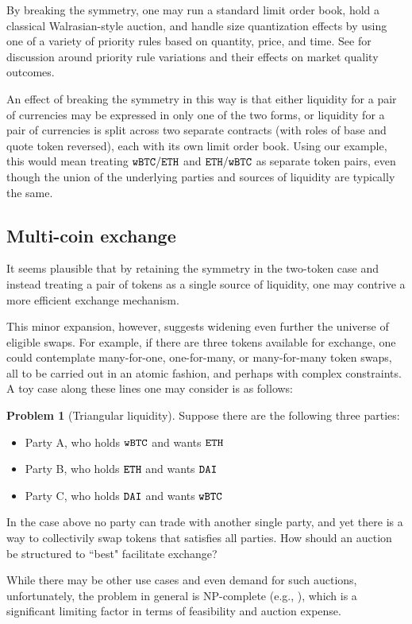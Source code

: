 \documentclass[11pt, reqno]{amsart}
\theoremstyle{definition}
\newtheorem{problem}{Problem}[subsection]
\theoremstyle{remark}
\newcommand{\BTC}{\textnormal{\texttt{wBTC}}}
\newcommand{\ETH}{\textnormal{\texttt{ETH}}}
\newcommand{\DAI}{\textnormal{\texttt{DAI}}}
\begin{document}
By breaking the symmetry, one may run a standard limit order book, hold a
classical Walrasian-style auction, and handle size quantization effects by
using one of a variety of priority rules based on quantity, price, and time.
See \cite{BeLaLiVa22} for discussion around priority rule variations and their
effects on market quality outcomes.

An effect of breaking the symmetry in this way is that either liquidity for a
pair of currencies may be expressed in only one of the two forms, or liquidity
for a pair of currencies is split across two separate contracts (with roles of
base and quote token reversed), each with its own limit order book.
Using our example, this would mean treating $\BTC/\ETH$ and $\ETH/\BTC$ as
separate token pairs, even though the union of the underlying parties and
sources of liquidity are typically the same.

\subsection{Multi-coin exchange}
It seems plausible that by retaining the symmetry in the two-token case and
instead treating a pair of tokens as a single source of liquidity, one may
contrive a more efficient exchange mechanism.

This minor expansion, however, suggests widening even further the universe of
eligible swaps. For example, if there are three tokens available for exchange,
one could contemplate many-for-one, one-for-many, or many-for-many token swaps,
all to be carried out in an atomic fashion, and perhaps with complex
constraints. A toy case along these lines one may consider is as follows:

\begin{problem}[Triangular liquidity]
Suppose there are the following three parties:
\begin{itemize}
	\item Party A, who holds $\BTC$ and wants $\ETH$
	\item Party B, who holds $\ETH$ and wants $\DAI$
	\item Party C, who holds $\DAI$ and wants $\BTC$
\end{itemize}

In the case above no party can trade with another single party, and yet there
is a way to collectivily swap tokens that satisfies all parties.
How should an auction be structured to ``best" facilitate exchange?
\end{problem}
While there may be other use cases and even demand for such auctions,
unfortunately, the problem in general is NP-complete (e.g., \cite{XiStWh05}),
which is a significant limiting factor in terms of feasibility and
auction expense.
\end{document}
